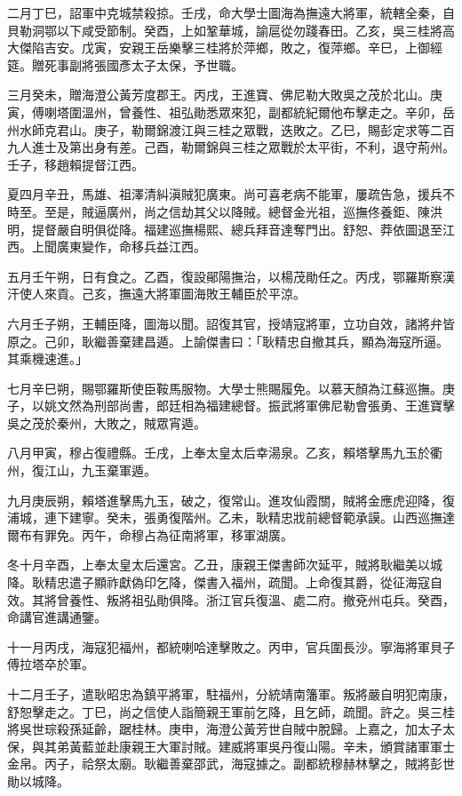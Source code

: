 \begin{pinyinscope}
二月丁巳，詔軍中克城禁殺掠。壬戌，命大學士圖海為撫遠大將軍，統轄全秦，自貝勒洞鄂以下咸受節制。癸酉，上如鞏華城，諭扈從勿踐春田。乙亥，吳三桂將高大傑陷吉安。戊寅，安親王岳樂擊三桂將於萍鄉，敗之，復萍鄉。辛巳，上御經筵。贈死事副將張國彥太子太保，予世職。

三月癸未，贈海澄公黃芳度郡王。丙戌，王進寶、佛尼勒大敗吳之茂於北山。庚寅，傅喇塔圍溫州，曾養性、祖弘勛悉眾來犯，副都統紀爾他布擊走之。辛卯，岳州水師克君山。庚子，勒爾錦渡江與三桂之眾戰，迭敗之。乙巳，賜彭定求等二百九人進士及第出身有差。己酉，勒爾錦與三桂之眾戰於太平街，不利，退守荊州。壬子，移趙賴提督江西。

夏四月辛丑，馬雄、祖澤清糾滇賊犯廣東。尚可喜老病不能軍，屢疏告急，援兵不時至。至是，賊逼廣州，尚之信劫其父以降賊。總督金光祖，巡撫佟養鉅、陳洪明，提督嚴自明俱從降。福建巡撫楊熙、總兵拜音達奪門出。舒恕、莽依圖退至江西。上聞廣東變作，命移兵益江西。

五月壬午朔，日有食之。乙酉，復設鄖陽撫治，以楊茂勛任之。丙戌，鄂羅斯察漢汗使人來貢。己亥，撫遠大將軍圖海敗王輔臣於平涼。

六月壬子朔，王輔臣降，圖海以聞。詔復其官，授靖寇將軍，立功自效，諸將弁皆原之。己卯，耿繼善棄建昌遁。上諭傑書曰：「耿精忠自撤其兵，顯為海寇所逼。其乘機速進。」

七月辛巳朔，賜鄂羅斯使臣鞍馬服物。大學士熊賜履免。以慕天顏為江蘇巡撫。庚子，以姚文然為刑部尚書，郎廷相為福建總督。振武將軍佛尼勒會張勇、王進寶擊吳之茂於秦州，大敗之，賊眾宵遁。

八月甲寅，穆占復禮縣。壬戌，上奉太皇太后幸湯泉。乙亥，賴塔擊馬九玉於衢州，復江山，九玉棄軍遁。

九月庚辰朔，賴塔進擊馬九玉，破之，復常山。進攻仙霞關，賊將金應虎迎降，復浦城，連下建寧。癸未，張勇復階州。乙未，耿精忠戕前總督範承謨。山西巡撫達爾布有罪免。丙午，命穆占為征南將軍，移軍湖廣。

冬十月辛酉，上奉太皇太后還宮。乙丑，康親王傑書師次延平，賊將耿繼美以城降。耿精忠遣子顯祚獻偽印乞降，傑書入福州，疏聞。上命復其爵，從征海寇自效。其將曾養性、叛將祖弘勛俱降。浙江官兵復溫、處二府。撤兗州屯兵。癸酉，命講官進講通鑒。

十一月丙戌，海寇犯福州，都統喇哈達擊敗之。丙申，官兵圍長沙。寧海將軍貝子傅拉塔卒於軍。

十二月壬子，遣耿昭忠為鎮平將軍，駐福州，分統靖南籓軍。叛將嚴自明犯南康，舒恕擊走之。丁巳，尚之信使人詣簡親王軍前乞降，且乞師，疏聞。許之。吳三桂將吳世琮殺孫延齡，踞桂林。庚申，海澄公黃芳世自賊中脫歸。上嘉之，加太子太保，與其弟黃藍並赴康親王大軍討賊。建威將軍吳丹復山陽。辛未，頒賞諸軍軍士金帛。丙子，祫祭太廟。耿繼善棄邵武，海寇據之。副都統穆赫林擊之，賊將彭世勛以城降。


\end{pinyinscope}
